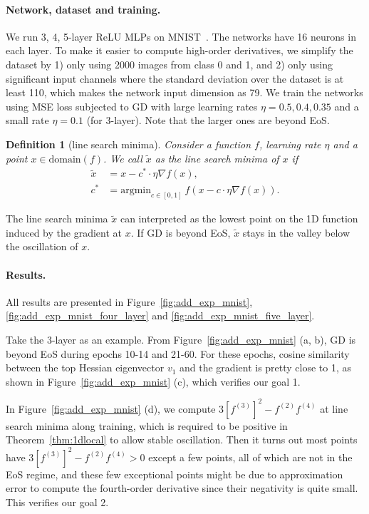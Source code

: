 \documentclass{article}
\theoremstyle{plain}
\newtheorem{defi}{Definition}
\theoremstyle{remark}
\begin{document}
\paragraph{Network, dataset and training.}
We run 3, 4, 5-layer ReLU MLPs on MNIST~\cite{lecun1998gradient}. The networks have 16 neurons in each layer. To make it easier to compute high-order derivatives, we simplify the dataset by 1) only using 2000 images from class 0 and 1, and 2) only using significant input channels where the standard deviation over the dataset is at least 110, which makes the network input dimension as 79. We train the networks using MSE loss subjected to GD with large learning rates $\eta=0.5, 0.4, 0.35$ and a small rate $\eta=0.1$ (for 3-layer). Note that the larger ones are beyond EoS.

\begin{defi}[line search minima]
Consider a function $f$, learning rate $\eta$ and a point $x\in \text{domain}(f)$. We call $\tilde{x}$ as the line search minima of $x$ if
\begin{align}
    \tilde{x}&=x-c^*\cdot \eta \nabla f(x),\\
    c^* &= \text{argmin}_{c\in[0,1]} ~f\left(x-c\cdot \eta\nabla f(x)\right).
\end{align}
\end{defi}

The line search minima $\tilde{x}$ can interpreted as the lowest point on the 1D function induced by the gradient at $x$. If GD is beyond EoS, $\tilde{x}$ stays in the valley below the oscillation of $x$.

\paragraph{Results.} All results are presented in Figure~\ref{fig:add_exp_mnist}, \ref{fig:add_exp_mnist_four_layer} and \ref{fig:add_exp_mnist_five_layer}. 

Take the 3-layer as an example. From Figure~\ref{fig:add_exp_mnist} (a, b), GD is beyond EoS during epochs 10-14 and 21-60. For these epochs, cosine similarity between the top Hessian eigenvector $v_1$ and the gradient is pretty close to 1, as shown in Figure~\ref{fig:add_exp_mnist} (c), which verifies our goal 1.

In Figure~\ref{fig:add_exp_mnist} (d), we compute $3[f^{(3)}]^2 - f^{(2)}f^{(4)}$ at line search minima along training, which is required to be positive in Theorem~\ref{thm:1dlocal} to allow stable oscillation. Then it turns out most points have $3[f^{(3)}]^2 - f^{(2)}f^{(4)}>0$ except a few points, all of which are not in the EoS regime, and these few exceptional points might be due to approximation error to compute the fourth-order derivative since their negativity is quite small. This verifies our goal 2.
\end{document}
